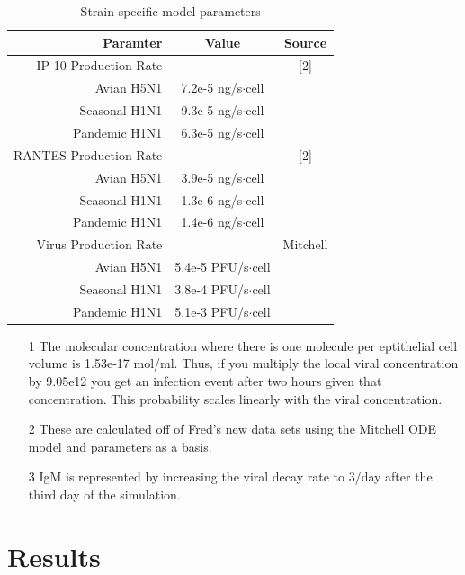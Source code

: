 \documentclass[10pt]{article}
\begin{document}
\begin{table}
\begin{center}
\begin{tabular}{ | r | c | c | }
  \hline                        
  Paramter & Value & Source \\
  \hline
  IP-10 Production Rate &  & [2]\\
  Avian H5N1 & 7.2e-5 ng/s$\cdot$cell & \\
  Seasonal H1N1 & 9.3e-5 ng/s$\cdot$cell& \\
  Pandemic H1N1 & 6.3e-5 ng/s$\cdot$cell& \\
  \hline
  RANTES Production Rate & & [2] \\
  Avian H5N1 & 3.9e-5 ng/s$\cdot$cell& \\
  Seasonal H1N1 & 1.3e-6 ng/s$\cdot$cell& \\
  Pandemic H1N1 & 1.4e-6 ng/s$\cdot$cell& \\
  \hline
  Virus Production Rate &  & Mitchell \\
  Avian H5N1 & 5.4e-5 PFU/s$\cdot$cell& \\
  Seasonal H1N1 & 3.8e-4 PFU/s$\cdot$cell& \\
  Pandemic H1N1 & 5.1e-3 PFU/s$\cdot$cell& \\  
  \hline  
\end{tabular}
\caption{Strain specific model parameters}
\label{table:strains}
\end{center}
\end{table}

\begin{itemize}
\item[1] The molecular concentration where there is one molecule per eptithelial cell volume is 1.53e-17 mol/ml.  Thus, if you multiply the local viral concentration by 9.05e12 you get an infection event after two hours given that concentration.  This probability scales linearly with the viral concentration.
\item[2] These are calculated off of Fred's new data sets using the Mitchell ODE model and parameters as a basis.
\item[3] IgM is represented by increasing the viral decay rate to 3/day after the third day of the simulation.
\end{itemize}


\section*{Results}
\end{document}

